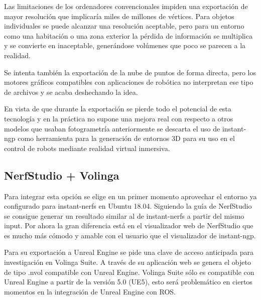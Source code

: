 \documentclass[a4paper, 12pt, spanish, twoside]{article}
\begin{document}
Las limitaciones de los ordenadores convencionales impiden una exportación de mayor resolución que implicaría miles de millones de vértices. Para objetos individuales se puede alcanzar una resolución aceptable, pero para un entorno como una habitación o una zona exterior la pérdida de información se multiplica y se convierte en inaceptable, generándose volúmenes que poco se parecen a la realidad. 



Se intenta también la exportación de la nube de puntos de forma directa, pero los motores gráficos compatibles con aplicaciones de robótica no interpretan ese tipo de archivos y se acaba deshechando la idea. 

En vista de que durante la exportación se pierde todo el potencial de esta tecnología y en la práctica no supone una mejora real con respecto a otros modelos que usaban fotogrametría anteriormente se descarta el uso de instant-ngp como herramienta para la generación de entornos 3D para su uso en el control de robots mediante realidad virtual inmersiva. 


\subsection{NerfStudio + Volinga}

Para integrar esta opción se elige en un primer momento aprovechar el entorno ya configurado para instant-nerfs en Ubuntu 18.04. Siguiendo la guía de NerfStudio se consigue generar un resultado similar al de instant-nerfs a partir del mismo input. Por ahora la gran diferencia está en el visualizador web de NerfStudio que es mucho más cómodo y amable con el usuario que el visualizador de instant-ngp.

Para su exportación a Unreal Engine se pide una clave de acceso anticipada para investigación en Volinga Suite. A través de su aplicación web se genera el objeto de tipo .nvol compatible con Unreal Engine. Volinga Suite sólo es compatible con Unreal Engine a partir de la versión 5.0 (UE5), esto será problemático en ciertos momentos en la integración de Unreal Engine con ROS.
\end{document}
